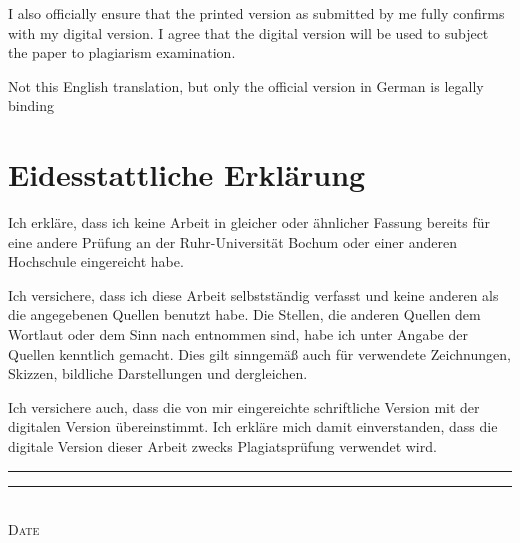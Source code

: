 \noindent
I also officially ensure that the printed version as submitted by me fully confirms with my digital version.
I agree that the digital version will be used to subject the paper to plagiarism examination.

\noindent
Not this English translation, but only the official version in German is legally binding

\section*{Eidesstattliche Erklärung}
{
Ich erkläre, dass ich keine Arbeit in gleicher oder ähnlicher Fassung bereits für eine andere Prüfung an der Ruhr-Universität Bochum oder einer anderen Hochschule eingereicht habe.

\noindent
Ich versichere, dass ich diese Arbeit selbstständig verfasst und keine anderen als die angegebenen Quellen benutzt habe. Die Stellen, die anderen Quellen dem Wortlaut oder dem Sinn nach entnommen sind, habe ich unter Angabe der Quellen kenntlich gemacht.
Dies gilt sinngemäß auch für verwendete Zeichnungen, Skizzen, bildliche Darstellungen und dergleichen.

\noindent
Ich versichere auch, dass die von mir eingereichte schriftliche Version mit der digitalen Version übereinstimmt.
Ich erkläre mich damit einverstanden, dass die digitale Version dieser Arbeit zwecks Plagiatsprüfung verwendet wird.\@}

\makeatletter
\vspace{2cm}
\rule{4cm}{0.1pt} \hfill \rule{7cm}{0.1pt} \\
\hspace*{1.5cm} \textsc{Date} \hspace*{7cm} \textsc{\@author}
\makeatother

\tableofcontents

\cleardoublepage
